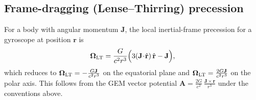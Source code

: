 \subsection*{Frame-dragging (Lense--Thirring) precession}
For a body with angular momentum $\mathbf{J}$, the local inertial-frame precession for a gyroscope at position $\mathbf{r}$ is
\begin{equation}
\boldsymbol{\Omega}_{\rm LT}=\frac{G}{c^2 r^3}\Big(3(\mathbf{J}\!\cdot\!\hat{\mathbf r})\,\hat{\mathbf r}-\mathbf{J}\Big),
\end{equation}
which reduces to $\boldsymbol{\Omega}_{\rm LT} = -\frac{G\mathbf{J}}{c^2 r^3}$ on the equatorial plane and
$\boldsymbol{\Omega}_{\rm LT} = \frac{2G\mathbf{J}}{c^2 r^3}$ on the polar axis. This follows from the GEM vector potential
$\mathbf{A} = \frac{2G}{c^2}\,\frac{\mathbf{J}\times \mathbf{r}}{r^3}$ under the conventions above.
